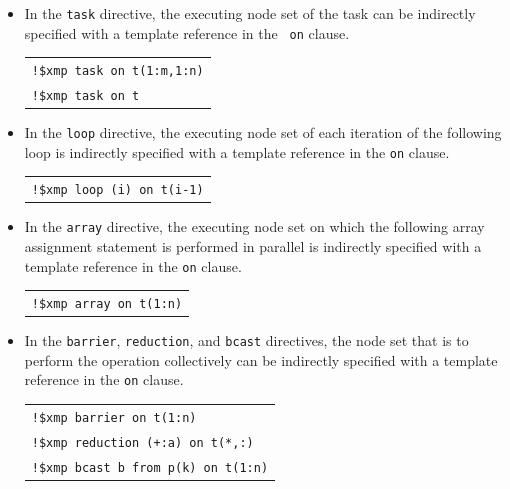 \begin{itemize}
\item In the {\tt task} directive, the executing node set of the task
      can be indirectly specified with a template reference in the {\tt
      on} clause.

\begin{tabular}{l}
\verb|!$xmp task on t(1:m,1:n)| \\
\verb|!$xmp task on t| \\
\end{tabular}

\item In the {\tt loop} directive, the executing node set of each
      iteration of the following loop is indirectly specified with a
      template reference in the {\tt on} clause.

\begin{tabular}{l}
\verb|!$xmp loop (i) on t(i-1)| \\
\end{tabular}%

\item In the {\tt array} directive, the executing node set on which the
      following array assignment statement is performed in parallel is
      indirectly specified with a template reference in the {\tt on}
      clause.

\begin{tabular}{l}
\verb|!$xmp array on t(1:n)| \\
\end{tabular}%

\item In the {\tt barrier}, {\tt reduction}, and {\tt bcast} directives,
      the node set that is to perform the operation collectively can be
      indirectly specified with a template reference in the {\tt on}
      clause.

\begin{tabular}{l}
\verb|!$xmp barrier on t(1:n)| \\
\verb|!$xmp reduction (+:a) on t(*,:)| \\
\verb|!$xmp bcast b from p(k) on t(1:n)| \\
\end{tabular}

\end{itemize}


